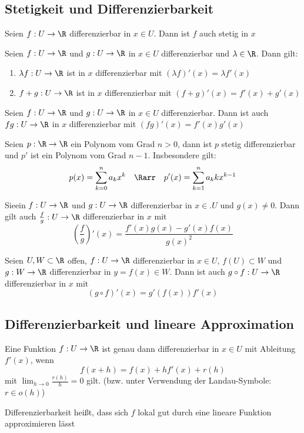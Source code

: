 	\subsection{Stetigkeit und Differenzierbarkeit}
		\begin{Satz} [ ]
			Seien $f: U\to\R$ differenzierbar in $x\in U$. Dann ist $f$ auch stetig in $x$
		\end{Satz}	
		\begin{Satz} [ Linearität]
				Seien $f: U\to \R$ und $g: U\to \R$ in $x\in U$ differenzierbar und $\lambda\in\R$. Dann gilt:
				\begin{enumerate}
						\item $\lambda f: U\to\R$ ist in $x$ differenzierbar mit $(\lambda f)'(x)=\lambda f'(x)$
						\item $f+g: U\to \R$ ist in $x$ differenzierbar mit $(f+g)'(x)=f'(x)+g'(x)$
				\end{enumerate}
		\end{Satz}
		\begin{Satz} [ Produktregel]
			Seien $f: U\to\R$ und $g: U\to\R$ in $x\in U$ differenzierbar. Dann ist auch $fg: U\to \R$ in $x$ differenzierbar mit $(fg)'(x)=f'(x)g'(x)$
		\end{Satz}
		\begin{Satz} [ ]
			Seien $p: \R \to \R$ ein Polynom vom Grad $n>0$, dann ist $p$ stetig differenzierbar und $p'$ ist ein Polynom vom Grad $n-1$. Insbesondere gilt:
			$$
				p(x)=\displaystyle\sum_{k=0}^na_kx^k \quad \Rarr \quad p'(x) = \displaystyle\sum _{k=1}^n a_kkx^{k-1}
			$$
		\end{Satz}
		\begin{Satz} [ Quotientenregel]
			Sieein $f: U\to \R$ und $g: U\to\R$ differenzierbar in $x\in. U$ und $g(x) \not = 0$. Dann gilt auch $\frac{f}{g}: U \to \R$ differenzierbar in $x$ mit
			$$
				(\frac{f}{g})'(x)=\frac{f'(x)g(x)-g'(x)f(x)}{g(x)^2}
			$$
		\end{Satz}
		\begin{Satz} [ Kettenregel]
			Seien $U, W \subset \R$ offen, $f: U \to\R$ differenzierbar in $x\in U$, $f(U)\subset W$ und $g: W \to \R$ differenzierbar in $y=f(x)\in W$. Dann ist auch $g \circ f : U \to \R$ differenzierbar in $x$ mit
			$$
				(g\circ f)'(x)=g'(f(x))f'(x)
			$$
		\end{Satz}
	\subsection{Differenzierbarkeit und lineare Approximation}
		\begin{Satz} [ ]
			Eine Funktion $f: U \to \R$ ist genau dann differenzierbar in $x\in U$ mit Ableitung $f'(x)$, wenn
			$$
				f(x+h)=f(x)+hf'(x)+r(h)
			$$
			mit $\lim_{h\to0}\frac{r(h)}{h}=0$ gilt. (bzw. unter Verwendung der Landau-Symbole: $r\in o(h)$)
		\end{Satz}
		Differenzierbarkeit heißt, dass sich $f$ lokal gut durch eine lineare Funktion approximieren lässt
